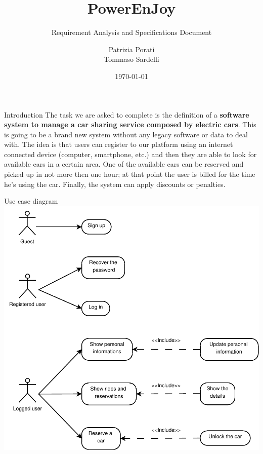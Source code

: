 \documentclass{beamer}
\title{PowerEnJoy}
\subtitle{Requirement Analysis and Specifications Document}
\author{Patrizia Porati \\ Tommaso Sardelli}
\date{\today}
\begin{document}
	
	\begin{frame}
		\maketitle
	\end{frame}

	\begin{frame}
		\frametitle{}
		\begin{block}{Introduction}
			The task we are asked to complete is the definition of a \textbf{software system to manage a car sharing
			service composed by electric cars}. This is going to be a brand new system without any
			legacy software or data to deal with. The idea is that users can register to our platform
			using an internet connected device (computer, smartphone, etc.) and then they are able to
			look for available cars in a certain area. 
			One of the available cars can be reserved and picked up in not more then one hour; at that
			point the user is billed for the time he's using the car.
			Finally, the system can apply discounts or penalties.
		\end{block}
	\end{frame}

	\begin{frame} {Use case diagram}
		\includegraphics[height = 0.85\textheight]{figures/UseCaseDiagram.pdf}
	\end{frame}
\end{document}
